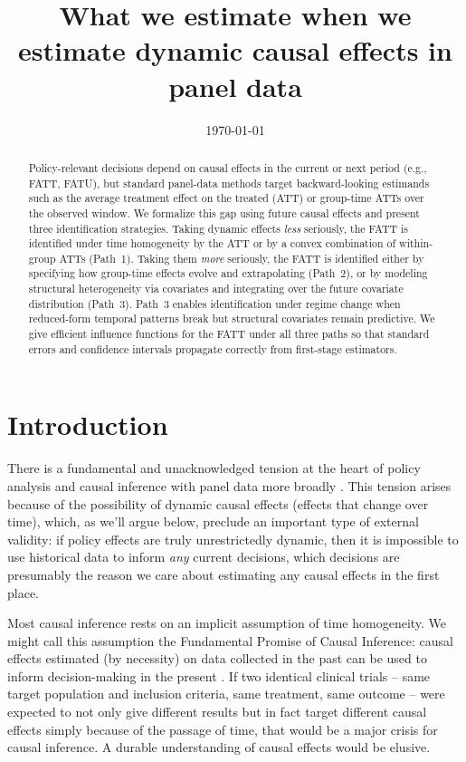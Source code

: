 \documentclass{article}
\title{What we estimate when we estimate dynamic causal effects in panel data}
\date{\today}
\begin{document}
\maketitle

\begin{abstract}
Policy-relevant decisions depend on causal effects in the current or next period (e.g., FATT, FATU), but standard panel-data methods target backward-looking estimands such as the average treatment effect on the treated (ATT) or group-time ATTs over the observed window. We formalize this gap using future causal effects and present three identification strategies. Taking dynamic effects \emph{less} seriously, the FATT is identified under time homogeneity by the ATT or by a convex combination of within-group ATTs (Path~1). Taking them \emph{more} seriously, the FATT is identified either by specifying how group-time effects evolve and extrapolating (Path~2), or by modeling structural heterogeneity via covariates and integrating over the future covariate distribution (Path~3). Path~3 enables identification under regime change when reduced-form temporal patterns break but structural covariates remain predictive. We give efficient influence functions for the FATT under all three paths so that standard errors and confidence intervals propagate correctly from first-stage estimators.
\end{abstract}

\section{Introduction}

There is a fundamental and unacknowledged tension at the heart of policy analysis and causal inference with panel data more broadly \citep{egamiElementsExternalValidity2023,heckmanPolicyRelevantTreatmentEffects2001}. This tension arises because of the possibility of dynamic causal effects (effects that change over time), which, as we'll argue below, preclude an important type of external validity: if policy effects are truly unrestrictedly dynamic, then it is impossible to use historical data to inform \textit{any} current decisions, which decisions are presumably the reason we care about estimating any causal effects in the first place. 

Most causal inference rests on an implicit assumption of time homogeneity. We might call this assumption the Fundamental Promise of Causal Inference: causal effects estimated (by necessity) on data collected in the past can be used to inform decision-making in the present \citep{egamiElementsExternalValidity2023,khosrowiExtrapolationCausalEffects2019,cartwrightHuntingCausesUsing2007}. If two identical clinical trials -- same target population and inclusion criteria, same treatment, same outcome -- were expected to not only give different results but in fact target different causal effects simply because of the passage of time, that would be a major crisis for causal inference. A durable understanding of causal effects would be elusive.
\end{document}
